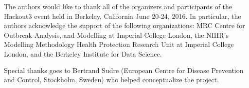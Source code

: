 \documentclass[9pt,a4paper,]{extarticle}
\theoremstyle{definition}
\theoremstyle{definition}
\theoremstyle{definition}
\theoremstyle{remark}
\begin{document}
The authors would like to thank all of the organizers and participants of the Hackout3 event held in Berkeley, California June 20-24, 2016. In particular, the authors acknowledge the support of the following organizations: MRC Centre for Outbreak Analysis, and Modelling at Imperial College London, the NIHR's Modelling Methodology Health Protection Research Unit at Imperial College London, and the Berkeley Institute for Data Science.

Special thanks goes to Bertrand Sudre (European Centre for Disease Prevention and Control, Stockholm, Sweden) who helped conceptualize the project.

{\small}
\end{document}
